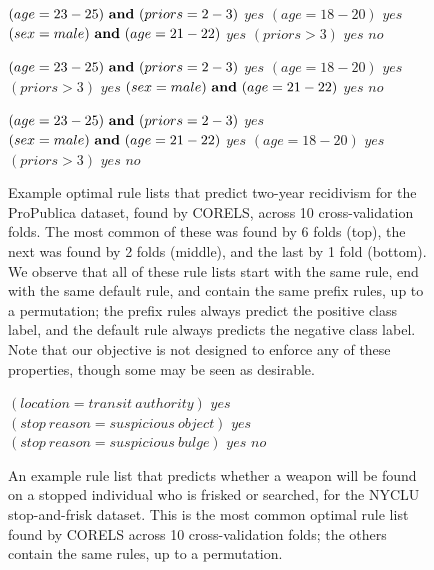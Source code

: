 \begin{figure}[t]
\begin{algorithmic}
\State \bif $(age = 23-25) {\bf ~and~} (priors = 2-3)$ \bthen $yes$
\State \belif $(age = 18-20)$ \bthen $yes$
\State \belif $(sex = male) {\bf ~and~} (age = 21-22)$ \bthen $yes$
\State \belif $(priors > 3)$ \bthen $yes$
\State \belse $no$
\end{algorithmic}
\vspace{1mm}
\begin{algorithmic}
\State \bif $(age = 23-25) {\bf ~and~} (priors = 2-3)$ \bthen $yes$
\State \belif $(age = 18-20)$ \bthen $yes$
\State \belif $(priors > 3)$ \bthen $yes$
\State \belif $(sex = male) {\bf ~and~} (age = 21-22)$ \bthen $yes$
\State \belse $no$
\end{algorithmic}
\vspace{1mm}
\begin{algorithmic}
\State \bif $(age = 23-25) {\bf ~and~} (priors = 2-3)$ \bthen $yes$
\State \belif $(sex = male) {\bf ~and~} (age = 21-22)$ \bthen $yes$
\State \belif $(age = 18-20)$ \bthen $yes$
\State \belif $(priors > 3)$ \bthen $yes$
\State \belse $no$
\end{algorithmic}
\caption{Example optimal rule lists that predict two-year recidivism for the
ProPublica dataset, found by CORELS, across 10 cross-validation folds.
%
The most common of these was found by 6 folds (top),
the next was found by 2 folds (middle), and the last by 1 fold (bottom).
%
We observe that all of these rule lists start with the same rule,
end with the same default rule, and contain the same prefix rules, up to a permutation;
the prefix rules always predict the positive class label,
and the default rule always predicts the negative class label.
%
Note that our objective is not designed to enforce any of these properties,
though some may be seen as desirable.
}
\label{fig:recidivism-all-folds}
\end{figure}

\begin{figure}[t!]
\begin{algorithmic}
\State \bif $(location = transit~authority)$ \bthen $yes$
\State \belif $(stop~reason = suspicious~object)$ \bthen $yes$
\State \belif $(stop~reason = suspicious~bulge)$ \bthen $yes$
\State \belse $no$
\end{algorithmic}
\caption{An example rule list that predicts whether a weapon will be found on a
stopped individual who is frisked or searched, for the NYCLU stop-and-frisk dataset.
%
This is the most common optimal rule list found by CORELS across 10 cross-validation
folds; the others contain the same rules, up to a permutation.
}
\label{fig:weapon-rule-list}
\end{figure}

